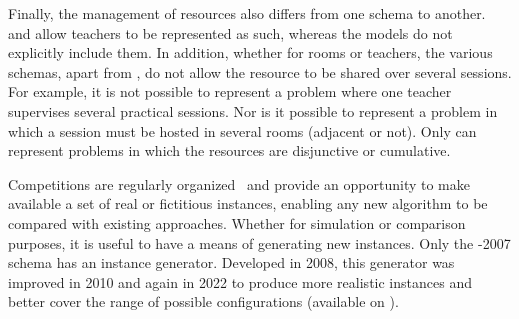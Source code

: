 Finally, the management of resources also differs from one schema to another. \XHSTT{} and \UTP{} allow teachers to be represented as such, whereas the \ITC{} models do not explicitly include them. In addition, whether for rooms or teachers, the various schemas, apart from \UTP{}, do not allow the resource to be shared over several sessions. For example, it is not possible to represent a problem where one teacher supervises several practical sessions. Nor is it possible to represent a problem in which a session must be hosted in several rooms (adjacent or not). Only \UTP{} can represent problems in which the resources are disjunctive or cumulative.



Competitions are regularly organized~\cite{2019_ITC} and provide an opportunity to make available a set of real or fictitious instances, enabling any new algorithm to be compared with existing approaches.
Whether for simulation or comparison purposes, it is useful to have a means of generating new instances.
Only the \ITC{}-2007 schema has an instance generator. Developed in 2008, this generator was improved in 2010 and again in 2022 to produce more realistic instances and better cover the range of possible configurations (available on \cite{2022_dataset}).